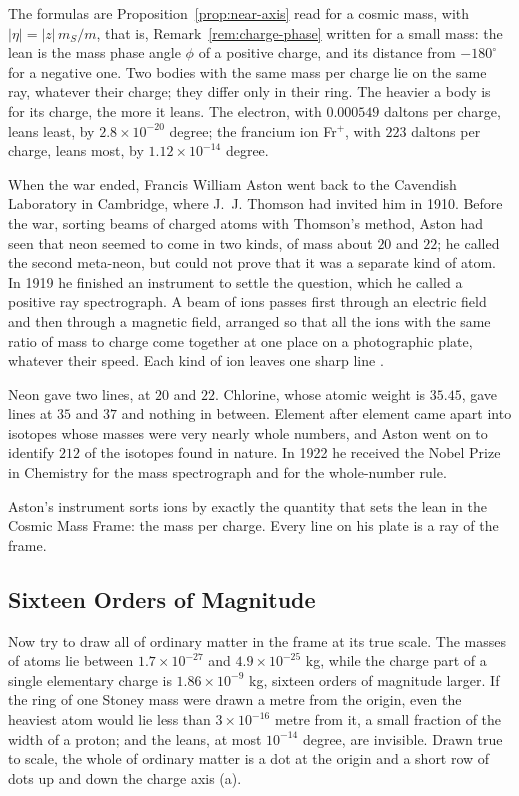 The formulas are Proposition~\ref{prop:near-axis} read for a cosmic mass, with $|\eta| = |z|\,m_S/m$, that is, Remark~\ref{rem:charge-phase} written for a small mass: the lean is the mass phase angle $\phi$ of a positive charge, and its distance from $-180^\circ$ for a negative one. Two bodies with the same mass per charge lie on the same ray, whatever their charge; they differ only in their ring. The heavier a body is for its charge, the more it leans. The electron, with $0.000549$ daltons per charge, leans least, by $2.8 \times 10^{-20}$ degree; the francium ion Fr$^+$, with $223$ daltons per charge, leans most, by $1.12 \times 10^{-14}$ degree.


When the war ended, Francis William Aston went back to the Cavendish Laboratory in Cambridge, where J.~J. Thomson had invited him in 1910. Before the war, sorting beams of charged atoms with Thomson's method, Aston had seen that neon seemed to come in two kinds, of mass about $20$ and $22$; he called the second meta-neon, but could not prove that it was a separate kind of atom. In 1919 he finished an instrument to settle the question, which he called a positive ray spectrograph. A beam of ions passes first through an electric field and then through a magnetic field, arranged so that all the ions with the same ratio of mass to charge come together at one place on a photographic plate, whatever their speed. Each kind of ion leaves one sharp line \citep{Aston1919}.

Neon gave two lines, at $20$ and $22$. Chlorine, whose atomic weight is $35.45$, gave lines at $35$ and $37$ and nothing in between. Element after element came apart into isotopes whose masses were very nearly whole numbers, and Aston went on to identify $212$ of the isotopes found in nature. In 1922 he received the Nobel Prize in Chemistry for the mass spectrograph and for the whole-number rule.

Aston's instrument sorts ions by exactly the quantity that sets the lean in the Cosmic Mass Frame: the mass per charge. Every line on his plate is a ray of the frame.

\subsection{Sixteen Orders of Magnitude}\label{subsec:sm-scale}

Now try to draw all of ordinary matter in the frame at its true scale. The masses of atoms lie between $1.7 \times 10^{-27}$ and $4.9 \times 10^{-25}$ kg, while the charge part of a single elementary charge is $1.86 \times 10^{-9}$ kg, sixteen orders of magnitude larger. If the ring of one Stoney mass were drawn a metre from the origin, even the heaviest atom would lie less than $3 \times 10^{-16}$ metre from it, a small fraction of the width of a proton; and the leans, at most $10^{-14}$ degree, are invisible. Drawn true to scale, the whole of ordinary matter is a dot at the origin and a short row of dots up and down the charge axis (a).

